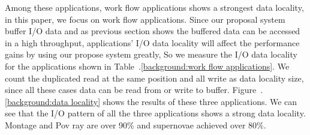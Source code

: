 Among these applications, work flow applications shows a strongest data locality, in this paper, we
focus on work flow applications.
Since our proposal
system buffer I/O data and as previous section shows the buffered data can be accessed in a high throughput, applications' I/O data locality will affect the performance gains by
using our propose system greatly, So we measure the I/O data locality for the applications shown in
Table~.\ref{background:work flow applications}.
We count the duplicated read at the same position and all write as data locality size, since all
these cases data can be read from or write to buffer.
Figure~.\ref{background:data locality} shows the results of these three applications.
We can see
that the I/O pattern of all the three applications shows a strong data locality. Montage and Pov ray
are over 90\% and supernovae achieved over 80\%.

